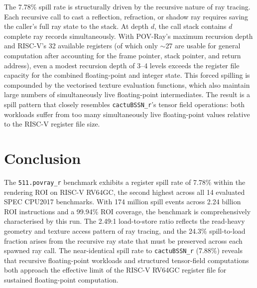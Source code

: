 \documentclass[conference]{IEEEtran}
\begin{document}
The 7.78\% spill rate is structurally driven by the recursive nature
of ray tracing. Each recursive call to cast a reflection, refraction,
or shadow ray requires saving the caller's full ray state to the stack.
At depth $d$, the call stack contains $d$ complete ray records
simultaneously. With POV-Ray's maximum recursion depth and RISC-V's
32 available registers (of which only $\sim$27 are usable for
general computation after accounting for the frame pointer, stack
pointer, and return address), even a modest recursion depth of 3--4
levels exceeds the register file capacity for the combined floating-point
and integer state. This forced spilling is compounded by the vectorised
texture evaluation functions, which also maintain large numbers of
simultaneously live floating-point intermediates. The result is a
spill pattern that closely resembles \texttt{cactuBSSN\_r}'s tensor
field operations: both workloads suffer from too many simultaneously
live floating-point values relative to the RISC-V register file size.

\section{Conclusion}

The \texttt{511.povray\_r} benchmark exhibits a register spill rate
of 7.78\% within the rendering ROI on RISC-V RV64GC, the second
highest across all 14 evaluated SPEC CPU2017 benchmarks. With 174
million spill events across 2.24 billion ROI instructions and a
99.94\% ROI coverage, the benchmark is comprehensively characterised
by this run. The 2.49:1 load-to-store ratio reflects the read-heavy
geometry and texture access pattern of ray tracing, and the 24.3\%
spill-to-load fraction arises from the recursive ray state that must
be preserved across each spawned ray call. The near-identical spill
rate to \texttt{cactuBSSN\_r} (7.88\%) reveals that recursive
floating-point workloads and structured tensor-field computations
both approach the effective limit of the RISC-V RV64GC register
file for sustained floating-point computation.
\end{document}
